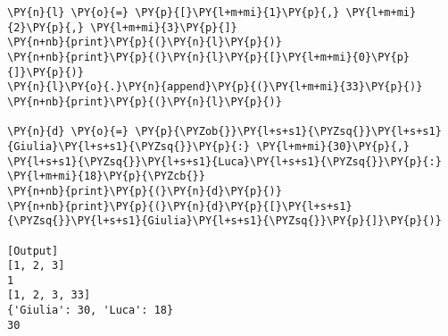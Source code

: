 \begin{Verbatim}[label=\makebox{\href{https://github.com/unipi-physics-labs/lab1-notes/tree/main/snippy/containers.py}{https://github.com/.../containers.py}},commandchars=\\\{\}]
\PY{n}{l} \PY{o}{=} \PY{p}{[}\PY{l+m+mi}{1}\PY{p}{,} \PY{l+m+mi}{2}\PY{p}{,} \PY{l+m+mi}{3}\PY{p}{]}
\PY{n+nb}{print}\PY{p}{(}\PY{n}{l}\PY{p}{)}
\PY{n+nb}{print}\PY{p}{(}\PY{n}{l}\PY{p}{[}\PY{l+m+mi}{0}\PY{p}{]}\PY{p}{)}
\PY{n}{l}\PY{o}{.}\PY{n}{append}\PY{p}{(}\PY{l+m+mi}{33}\PY{p}{)}
\PY{n+nb}{print}\PY{p}{(}\PY{n}{l}\PY{p}{)}

\PY{n}{d} \PY{o}{=} \PY{p}{\PYZob{}}\PY{l+s+s1}{\PYZsq{}}\PY{l+s+s1}{Giulia}\PY{l+s+s1}{\PYZsq{}}\PY{p}{:} \PY{l+m+mi}{30}\PY{p}{,} \PY{l+s+s1}{\PYZsq{}}\PY{l+s+s1}{Luca}\PY{l+s+s1}{\PYZsq{}}\PY{p}{:} \PY{l+m+mi}{18}\PY{p}{\PYZcb{}}
\PY{n+nb}{print}\PY{p}{(}\PY{n}{d}\PY{p}{)}
\PY{n+nb}{print}\PY{p}{(}\PY{n}{d}\PY{p}{[}\PY{l+s+s1}{\PYZsq{}}\PY{l+s+s1}{Giulia}\PY{l+s+s1}{\PYZsq{}}\PY{p}{]}\PY{p}{)}

[Output]
[1, 2, 3]
1
[1, 2, 3, 33]
{'Giulia': 30, 'Luca': 18}
30
\end{Verbatim}
